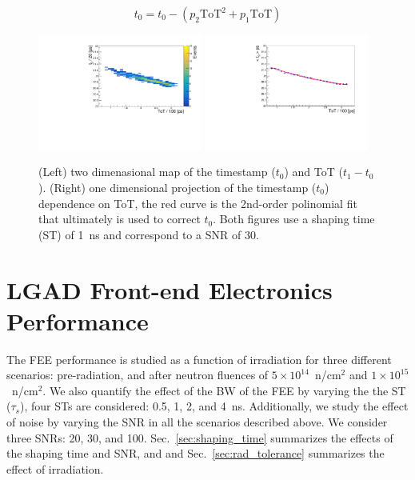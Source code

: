 \documentclass[preprint,1p]{elsarticle}
\begin{document}
\begin{equation}\label{eq:time_walk}
  t_{0} = t_{0}-(p_{2}\mathrm{ToT}^2+p_{1}\mathrm{ToT})
\end{equation}

\begin{figure}[htbp]
  \centering
  \includegraphics[width=0.48\textwidth]{figs/twoD_ToT_pre_rad_st_1ns_snr_30_le_tot_threshold_30mV_v2.pdf} \hfill
  \includegraphics[width=0.48\textwidth]{figs/oneD_ToT_pre_rad_st_1ns_snr_30_le_tot_threshold_30mV_v2.pdf}
  \caption{(Left) two dimenasional map of the timestamp ($t_{0}$) and ToT ($t_{1} - t_{0}$).
  (Right) one dimensional projection of the timestamp ($t_{0}$) dependence on ToT, the red curve is the 2nd-order polinomial fit that
  ultimately is used to correct $t_{0}$. Both figures use a shaping time (ST) of 1~\si{ns} and correspond to a SNR of 30.}
  \label{fig:ToT}
\end{figure}




\section{LGAD Front-end Electronics Performance}\label{sec:results}

The FEE performance is studied as a function of irradiation for three different
scenarios: pre-radiation, and after neutron fluences of $5\times
10^{14}$~n/cm$^2$ and $1\times 10^{15}$~n/cm$^2$. We also quantify the effect of
the BW of the FEE by varying the the ST ($\tau_{s}$), four STs are considered:
0.5, 1, 2, and 4~\si{ns}. Additionally, we study the effect of noise by varying
the SNR in all the scenarios described above. We consider three SNRs: 20, 30,
and 100. Sec.~\ref{sec:shaping_time} summarizes the effects of the shaping time
and SNR, and and Sec.~\ref{sec:rad_tolerance} summarizes the effect of
irradiation.
\end{document}
